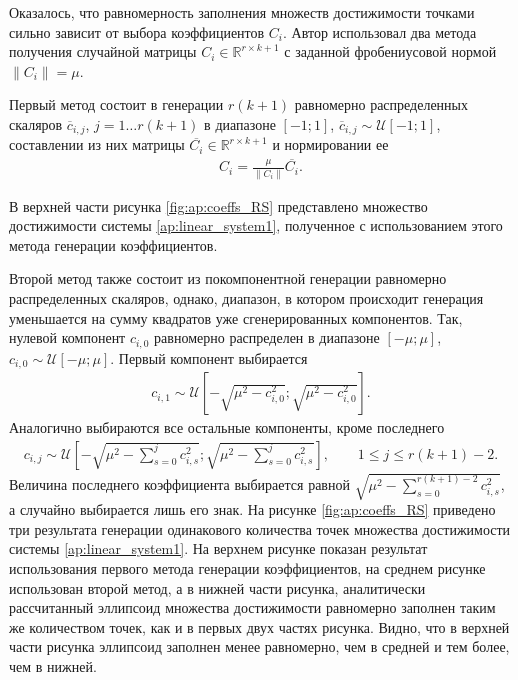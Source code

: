 \documentclass[../main.tex]{subfiles}
\begin{document}
 Оказалось, что равномерность заполнения множеств достижимости точками сильно зависит от выбора коэффициентов $C_i$. 
 Автор использовал два метода получения случайной матрицы $C_i \in \mathbb{R}^{r \times k+1}$ с заданной фробениусовой нормой $ \|C_i\| = \mu$. 
 
 Первый метод состоит в генерации $r (k + 1)$ равномерно распределенных скаляров $ \overline{c}_{i, j}$, $ j = 1\dots r (k + 1)$ в диапазоне $[-1;1] $, $\overline{c}_{i, j} \sim \mathcal{U}[-1;1]$, составлении из них матрицы $\overline{C_i} \in \mathbb{R}^{r \times k+1}$ и нормировании ее
 \begin{gather*}
 		C_i = \frac{\mu}{\|C_i\|}\overline{C_i}.
 \end{gather*}
 
 В верхней части рисунка \ref{fig:ap:coeffs_RS} представлено множество достижимости системы \eqref{ap:linear_system1}, полученное с использованием этого метода генерации коэффициентов. 
 
 Второй метод также состоит из покомпонентной генерации равномерно распределенных скаляров, однако, диапазон, в котором происходит генерация уменьшается на сумму квадратов уже сгенерированных компонентов.  
 Так, нулевой компонент $c_{i, 0}$ равномерно распределен в диапазоне $[-\mu; \mu]$, $c_{i, 0} \sim \mathcal{U}[-\mu; \mu]$. 
 Первый компонент выбирается 
 \begin{gather*}
 	 c_{i, 1} \sim \mathcal{U}\left[-\sqrt{\mu^2 - c_{i, 0}^2}; \sqrt{\mu^2 - c_{i, 0}^2}\right].
 \end{gather*} 
 Аналогично выбираются все остальные компоненты, кроме последнего
  \begin{gather*}
 	c_{i, j} \sim \mathcal{U}\left[-\sqrt{\mu^2 - \sum\limits_{s = 0}^j c_{i, s}^2}; \sqrt{\mu^2 - \sum\limits_{s = 0}^j c_{i, s}^2}\right], \qquad 1 \leqslant j \leqslant r(k+1) - 2.
 \end{gather*} 
 Величина последнего коэффициента выбирается равной $\sqrt{\mu^2 - \sum\limits_{s = 0}^{r(k+1) - 2} c_{i, s}^2} $, а случайно выбирается лишь его знак.
 На рисунке \ref{fig:ap:coeffs_RS} приведено три результата генерации одинакового количества точек множества достижимости системы \eqref{ap:linear_system1}.
 На верхнем рисунке показан результат использования первого метода генерации коэффициентов, на среднем рисунке использован второй метод, а в нижней части рисунка, аналитически рассчитанный эллипсоид множества достижимости равномерно заполнен таким же количеством точек, как и в первых двух частях рисунка. 
 Видно, что в верхней части рисунка эллипсоид заполнен менее равномерно, чем в средней и тем более, чем в нижней. 
 
\end{document}
